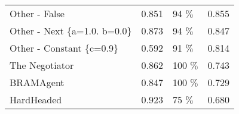 \begin{table}[h]
\begin{tabular}{llll}
Other - False                 & 0.851                                                                 & 94 $\%$                                                             & 0.855                                                       \\
Other - Next \{a=1.0. b=0.0\} & 0.873                                                                 & 94 $\%$                                                              & 0.847                                                       \\
Other - Constant \{c=0.9\}    & 0.592                                                                 & 91 $\%$                                                              & 0.814                                                       \\
The Negotiator                & 0.862                                                                 & 100  $\%$                                                            & 0.743                                                       \\
BRAMAgent                     & 0.847                                                                 & 100 $\%$                                                             & 0.729                                                       \\
HardHeaded                    & 0.923                                                                 & 75 $\%$                                                              & 0.680                                                      
\end{tabular}
\end{table}


